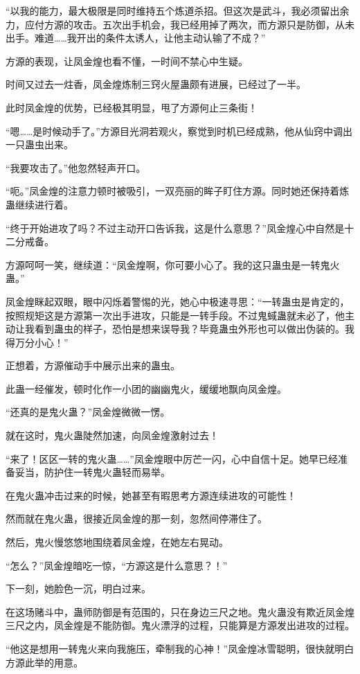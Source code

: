 \begin{this_body}
“以我的能力，最大极限是同时维持五个炼道杀招。但这次是武斗，我必须留出余力，应付方源的攻击。五次出手机会，我已经用掉了两次，而方源只是防御，从未出手。难道……我开出的条件太诱人，让他主动认输了不成？”

方源的表现，让凤金煌也看不懂，一时间不禁心中生疑。

时间又过去一炷香，凤金煌炼制三窍火屋蛊颇有进展，已经过了一半。

此时凤金煌的优势，已经极其明显，甩了方源何止三条街！

“嗯……是时候动手了。”方源目光洞若观火，察觉到时机已经成熟，他从仙窍中调出一只蛊虫出来。

“我要攻击了。”他忽然轻声开口。

“呃。”凤金煌的注意力顿时被吸引，一双亮丽的眸子盯住方源。同时她还保持着炼蛊继续进行着。

“终于开始进攻了吗？不过主动开口告诉我，这是什么意思？”凤金煌心中自然是十二分戒备。

方源呵呵一笑，继续道：“凤金煌啊，你可要小心了。我的这只蛊虫是一转鬼火蛊。”

凤金煌眯起双眼，眼中闪烁着警惕的光，她心中极速寻思：“一转蛊虫是肯定的，按照规矩这是方源第一次出手进攻，只能是一转手段。不过鬼蜮蛊就未必了，他主动让我看到蛊虫的样子，恐怕是想来误导我？毕竟蛊虫外形也可以做出伪装的。我得万分小心！”

正想着，方源催动手中展示出来的蛊虫。

此蛊一经催发，顿时化作一小团的幽幽鬼火，缓缓地飘向凤金煌。

“还真的是鬼火蛊？”凤金煌微微一愣。

就在这时，鬼火蛊陡然加速，向凤金煌激射过去！

“来了！区区一转的鬼火蛊……”凤金煌眼中厉芒一闪，心中自信十足。她早已经准备妥当，防护住一转鬼火蛊轻而易举。

在鬼火蛊冲击过来的时候，她甚至有暇思考方源连续进攻的可能性！

然而就在鬼火蛊，很接近凤金煌的那一刻，忽然间停滞住了。

然后，鬼火慢悠悠地围绕着凤金煌，在她左右晃动。

“怎么？”凤金煌暗吃一惊，“方源这是什么意思？！”

下一刻，她脸色一沉，明白过来。

在这场赌斗中，蛊师防御是有范围的，只在身边三尺之地。鬼火蛊没有欺近凤金煌三尺之内，凤金煌是不能防御。鬼火漂浮的过程，只能算是方源发出进攻的过程。

“他这是想用一转鬼火来向我施压，牵制我的心神！”凤金煌冰雪聪明，很快就明白方源此举的用意。


\end{this_body}
